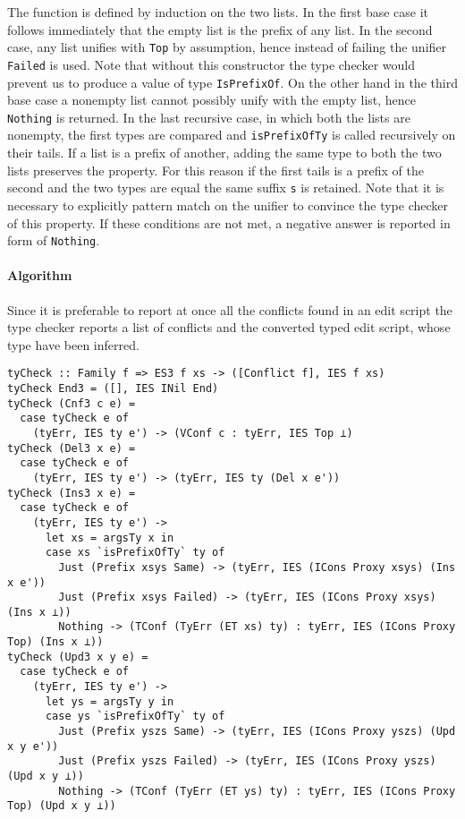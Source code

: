 \documentclass[../Thesis.tex]{subfiles}
\begin{document}
	The function is defined by induction on the two lists.
	In the first base case it follows immediately that the empty list is
	the prefix of any list. In the second case, any list unifies
	with \texttt{Top} by assumption, hence instead of failing
	the unifier \texttt{Failed} is used. Note that without this constructor
	the type checker would prevent us to produce a value of type
	\texttt{IsPrefixOf}.
	On the other hand in the third base case a nonempty list cannot possibly
	unify with the empty list, hence \texttt{Nothing} is returned.
	In the last recursive case, in which both the lists are nonempty, the first 
	types are compared and \texttt{isPrefixOfTy} is called recursively
	on their tails. If a list is a prefix of another, adding the same type to both
	the two lists preserves the property. For this reason if the first tails is a 
	prefix of the second and the two types are equal the same suffix
	\texttt{s} is retained. Note that it is necessary to explicitly pattern match
	on the unifier to convince the type checker of this property.
	If these conditions are not met, a negative answer is reported in form of 
	\texttt{Nothing}.	
		
	\paragraph{Algorithm}
	Since it is preferable to report at once all the conflicts found in an edit script
	the type checker reports a list of conflicts and the converted typed edit
	script, whose type have been inferred.
	
\begin{verbatim}
tyCheck :: Family f => ES3 f xs -> ([Conflict f], IES f xs)
tyCheck End3 = ([], IES INil End)
tyCheck (Cnf3 c e) =
  case tyCheck e of
    (tyErr, IES ty e') -> (VConf c : tyErr, IES Top ⊥)
tyCheck (Del3 x e) =
  case tyCheck e of
    (tyErr, IES ty e') -> (tyErr, IES ty (Del x e'))
tyCheck (Ins3 x e) =
  case tyCheck e of
    (tyErr, IES ty e') ->
      let xs = argsTy x in
      case xs `isPrefixOfTy` ty of
        Just (Prefix xsys Same) -> (tyErr, IES (ICons Proxy xsys) (Ins x e'))
        Just (Prefix xsys Failed) -> (tyErr, IES (ICons Proxy xsys) (Ins x ⊥))
        Nothing -> (TConf (TyErr (ET xs) ty) : tyErr, IES (ICons Proxy Top) (Ins x ⊥))
tyCheck (Upd3 x y e) =
  case tyCheck e of
    (tyErr, IES ty e') ->
      let ys = argsTy y in
      case ys `isPrefixOfTy` ty of
        Just (Prefix yszs Same) -> (tyErr, IES (ICons Proxy yszs) (Upd x y e'))
        Just (Prefix yszs Failed) -> (tyErr, IES (ICons Proxy yszs) (Upd x y ⊥))
        Nothing -> (TConf (TyErr (ET ys) ty) : tyErr, IES (ICons Proxy Top) (Upd x y ⊥))
\end{verbatim}
\end{document}
